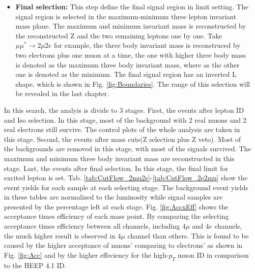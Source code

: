 \begin{itemize}
	\item \textbf{Final selection:} This step define the final signal region in limit setting. The signal region is selected in the maximum-minimum three lepton invariant mass plane. The maximum and minimum invariant mass is reconstructed by the reconstructed Z and the two remaining leptons one by one. Take $\mu \mu^{*} \rightarrow 2\mu 2e$ for example, the three body invariant mass is reconstruced by two electrons plus one muon at a time, the one with higher three body mass is denoted as the maximum three body invariant mass, where as the other one is denoted as the minimum. The final signal region has an inverted L shape, which is shown in Fig. \ref{fig:Boundaries}. The range of this selection will be revealed in the last chapter.     
\end{itemize}

In this search, the analyis is divide to 3 stages. First, the events after lepton ID and Iso selection. In this stage, most of the background with 2 real muons and 2 real electrons still survive. The control plots of the whole analysis are taken in this stage. Second, the events after mass cuts(Z selection plus Z veto). Most of the backgrounds are removed in this stage, with most of the signals survived. The maximum and minimum three body invariant mass are reconstructed in this stage. Last, the events after final selection. In this stage, the final limit for excited lepton is set.
\newline Tab. \ref{tab:CutFlow_2mu2e}-\ref{tab:CutFlow_2e2mu} show the event yields for each sample at each selecting stage. The background event yields in these tables are normalized to the luminosity while signal samples are presented by the percentage left at each stage. Fig. \ref{fig:AccxEff} shows the acceptance times efficiency of each mass point. By comparing the selecting  acceptance times efficiency between all channels, including $4\mu$ and $4e$ channels, the much higher result is observed in 4$\mu$ channel than others. This is found to be caused by the higher acceptance of muons' comparing to electrons' as shown in Fig. \ref{fig:Acc} and by the higher effeciency for the high-$p_{T}$ muon ID in comparison to the HEEP 4.1 ID.


